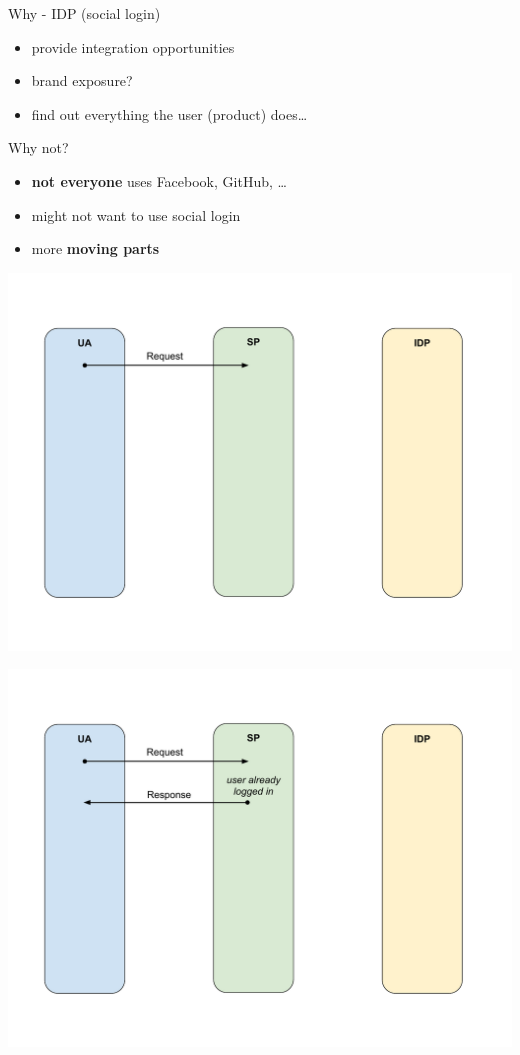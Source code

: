 \documentclass[ignorenonframetext,aspectratio=169]{beamer}
\providecommand{\tightlist}{%
  \setlength{\itemsep}{0pt}\setlength{\parskip}{0pt}}
\begin{document}
\begin{frame}{Why - IDP (social login)}
\begin{itemize}
\tightlist
\item provide integration opportunities
\item brand exposure?
\item find out everything the user (product) does\ldots
\end{itemize}
\end{frame}

\begin{frame}{Why not?}
\begin{itemize}
\tightlist
\item {\bf not everyone} uses Facebook, GitHub, \ldots
\item might not want to use social login
\item more {\bf moving parts}
\end{itemize}
\end{frame}

\begin{frame}[plain]
\centering
\includegraphics[height=\paperheight]{fedsso-proto-1.pdf}
\end{frame}

\begin{frame}[plain]
\centering
\includegraphics[height=\paperheight]{fedsso-proto-2-logged-in.pdf}
\end{frame}
\end{document}
